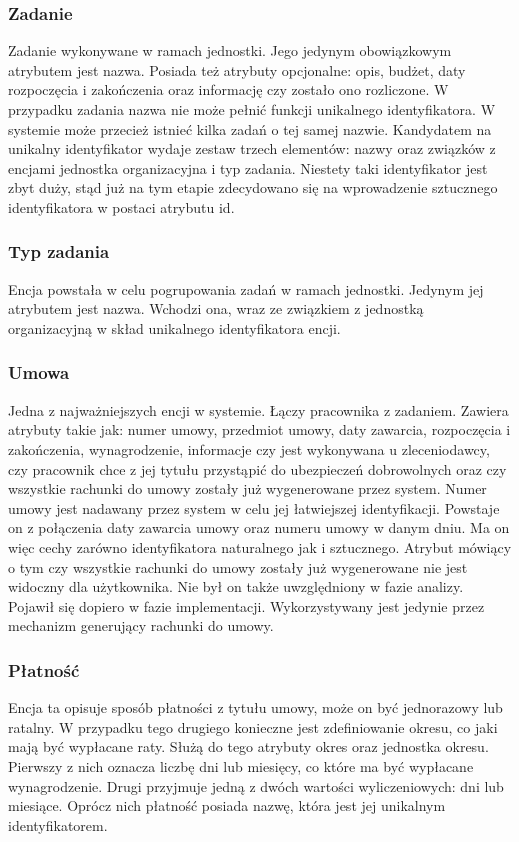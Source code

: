\subsubsection{Zadanie}
Zadanie wykonywane w ramach jednostki. Jego jedynym obowiązkowym atrybutem jest nazwa. Posiada też atrybuty opcjonalne: opis, budżet, daty rozpoczęcia i zakończenia oraz informację czy zostało ono rozliczone. W przypadku zadania nazwa nie może pełnić funkcji unikalnego identyfikatora. W systemie może przecież istnieć kilka zadań o tej samej nazwie. Kandydatem na unikalny identyfikator wydaje zestaw trzech elementów: nazwy oraz związków z encjami jednostka organizacyjna i typ zadania. Niestety taki identyfikator jest zbyt duży, stąd już na tym etapie zdecydowano się na wprowadzenie sztucznego identyfikatora w postaci atrybutu id.

\subsubsection{Typ zadania}
Encja powstała w celu pogrupowania zadań w ramach jednostki. Jedynym jej atrybutem jest nazwa. Wchodzi ona, wraz ze związkiem z jednostką organizacyjną w skład unikalnego identyfikatora encji.

\subsubsection{Umowa}
Jedna z najważniejszych encji w systemie. Łączy pracownika z zadaniem. Zawiera atrybuty takie jak: numer umowy, przedmiot umowy, daty zawarcia, rozpoczęcia i zakończenia, wynagrodzenie, informacje czy jest wykonywana u zleceniodawcy, czy pracownik chce z jej tytułu przystąpić do ubezpieczeń dobrowolnych oraz czy wszystkie rachunki do umowy zostały już wygenerowane przez system. Numer umowy jest nadawany przez system w celu jej łatwiejszej identyfikacji. Powstaje on z połączenia daty zawarcia umowy oraz numeru umowy w danym dniu. Ma on więc cechy zarówno identyfikatora naturalnego jak i sztucznego. Atrybut mówiący o tym czy wszystkie rachunki do umowy zostały już wygenerowane nie jest widoczny dla użytkownika. Nie był on także uwzględniony w fazie analizy. Pojawił się dopiero w fazie implementacji. Wykorzystywany jest jedynie przez mechanizm generujący rachunki do umowy.

\subsubsection{Płatność}
Encja ta opisuje sposób płatności z tytułu umowy, może on być jednorazowy lub ratalny. W przypadku tego drugiego konieczne jest zdefiniowanie okresu, co jaki mają być wypłacane raty. Służą do tego atrybuty okres oraz jednostka okresu. Pierwszy z nich oznacza liczbę dni lub miesięcy, co które ma być wypłacane wynagrodzenie. Drugi przyjmuje jedną z dwóch wartości wyliczeniowych: dni lub miesiące. Oprócz nich płatność posiada nazwę, która jest jej unikalnym identyfikatorem.

